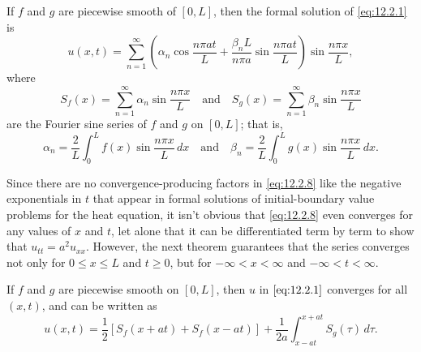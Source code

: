 \begin{definition}\label{thmtype:12.2.1}
If $f$ and $g$ are piecewise smooth of $[0,L]$, then
the  formal solution of  \eqref{eq:12.2.1}
is
\begin{equation} \label{eq:12.2.8}
u(x,t)=\sum_{n=1}^\infty\left(\alpha_n\cos\frac{n\pi at}{L}+\frac{\beta_nL}{n\pi a}\sin\frac{n\pi at}{L}\right)
\sin\frac{n\pi x}{L},
\end{equation}
where
\[
S_f(x)=\sum_{n=1}^\infty \alpha_n\sin\frac{n\pi x}{L}
\quad\text{and}\quad
S_{g}(x)=\sum_{n=1}^\infty \beta_n\sin\frac{n\pi x}{L}
\]
are the   Fourier sine series of $f$ and $g$ on $[0,L]$; that is,
\[
\alpha_n=\frac{2}{L}\int_0^Lf(x)\sin\frac{n\pi x}{L}\,dx
\quad\text{and}\quad
\beta_n=\frac{2}{L}\int_0^Lg(x)\sin\frac{n\pi x}{L}\,dx.
\]
\end{definition}


Since there are no  convergence-producing factors in \eqref{eq:12.2.8}
like the negative exponentials in $t$ that appear in formal solutions
of initial-boundary value problems for the heat equation, it isn't
obvious that  \eqref{eq:12.2.8} even converges
for any values of $x$ and $t$, let alone that it can be differentiated
term by term  to show that $u_{tt}=a^2u_{xx}$.
However, the next
theorem guarantees that  the series  converges
not only for $0\le x\le L$  and $t\ge0$, but for $-\infty<x<\infty$
and $-\infty<t<\infty$.


\begin{theorem}\label{thmtype:12.2.2}
If $f$ and $g$ are piecewise smooth on $[0,L]$, then
$u$ in $\eqref{eq:12.2.1}$ converges for all $(x,t)$,
and can be written as
\begin{equation} \label{eq:12.2.9}
u(x,t)=\frac{1}{2}[S_f(x+at)+S_f(x-at)]+
\frac{1}{2a}\int_{x-at}^{x+at}S_g(\tau)\,d\tau.
\end{equation}
\end{theorem}


